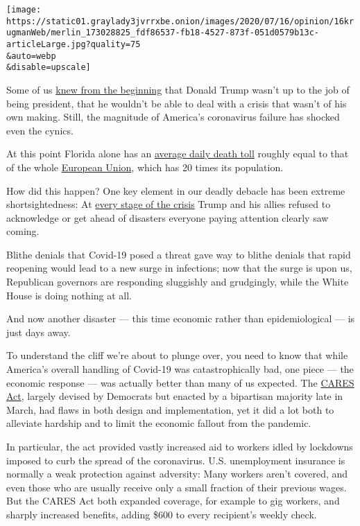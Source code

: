 \texttt{[image: https://static01.graylady3jvrrxbe.onion/images/2020/07/16/opinion/16krugmanWeb/merlin\_173028825\_fdf86537-fb18-4527-873f-051d0579b13c-articleLarge.jpg?quality=75\\\&auto=webp\\\&disable=upscale]}

Some of us
\href{https://krugman.blogs.nytimes3xbfgragh.onion/2016/11/11/the-long-haul/}{knew
from the beginning} that Donald Trump wasn't up to the job of being
president, that he wouldn't be able to deal with a crisis that wasn't of
his own making. Still, the magnitude of America's coronavirus failure
has shocked even the cynics.

At this point Florida alone has an
\href{https://covidtracking.com/data/charts/all-metrics-per-state}{average
daily death toll} roughly equal to that of the whole
\href{https://ourworldindata.org/coronavirus-data-explorer?zoomToSelection=true\&deathsMetric=true\&dailyFreq=true\&smoothing=7\&country=USA~EuropeanUnion\&pickerMetric=location\&pickerSort=asc}{European
Union}, which has 20 times its population.

How did this happen? One key element in our deadly debacle has been
extreme shortsightedness: At
\href{https://twitter.com/TBPInvictus/status/1281256803788107776}{every
stage of the crisis} Trump and his allies refused to acknowledge or get
ahead of disasters everyone paying attention clearly saw coming.

Blithe denials that Covid-19 posed a threat gave way to blithe denials
that rapid reopening would lead to a new surge in infections; now that
the surge is upon us, Republican governors are responding sluggishly and
grudgingly, while the White House is doing nothing at all.

And now another disaster --- this time economic rather than
epidemiological --- is just days away.

To understand the cliff we're about to plunge over, you need to know
that while America's overall handling of Covid-19 was catastrophically
bad, one piece --- the economic response --- was actually better than
many of us expected. The
\href{https://www.nytimes3xbfgragh.onion/2020/03/26/us/coronavirus-senate-stimulus-package.html}{CARES
Act}, largely devised by Democrats but enacted by a bipartisan majority
late in March, had flaws in both design and implementation, yet it did a
lot both to alleviate hardship and to limit the economic fallout from
the pandemic.

In particular, the act provided vastly increased aid to workers idled by
lockdowns imposed to curb the spread of the coronavirus. U.S.
unemployment insurance is normally a weak protection against adversity:
Many workers aren't covered, and even those who are usually receive only
a small fraction of their previous wages. But the CARES Act both
expanded coverage, for example to gig workers, and sharply increased
benefits, adding \$600 to every recipient's weekly check.

